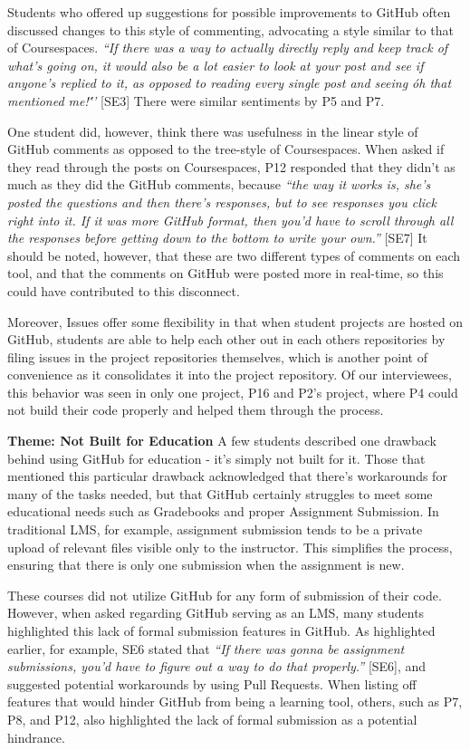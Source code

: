 Students who offered up suggestions for possible improvements to GitHub often discussed changes to this style of commenting, advocating a style similar to that of Coursespaces. \textit{``If there was a way to actually directly reply and keep track of what's going on, it would also be a lot easier to look at your post and see if anyone's replied to it, as opposed to reading every single post and seeing \'oh that mentioned me!\'''} [SE3] There were similar sentiments by P5 and P7.

One student did, however, think there was usefulness in the linear style of GitHub comments as opposed to the tree-style of Coursespaces. When asked if they read through the posts on Coursespaces, P12 responded that they didn't as much as they did the GitHub comments, because \textit{``the way it works is, she's posted the questions and then there's responses, but to see responses you click right into it. If it was more GitHub format, then you'd have to scroll through all the responses before getting down to the bottom to write your own.''} [SE7] It should be noted, however, that these are two different types of comments on each tool, and that the comments on GitHub were posted more in real-time, so this could have contributed to this disconnect.

Moreover, Issues offer some flexibility in that when student projects are hosted on GitHub, students are able to help each other out in each others repositories by filing issues in the project repositories themselves, which is another point of convenience as it consolidates it into the project repository. Of our interviewees, this behavior was seen in only one project, P16 and P2's project, where P4 could not build their code properly and helped them through the process.

\textbf{Theme: Not Built for Education} \break
A few students described one drawback behind using GitHub for education - it's simply not built for it. Those that mentioned this particular drawback acknowledged that there's workarounds for many of the tasks needed, but that GitHub certainly struggles to meet some educational needs such as Gradebooks and proper Assignment Submission. In traditional LMS, for example, assignment submission tends to be a private upload of relevant files visible only to the instructor. This simplifies the process, ensuring that there is only one submission when the assignment is new.

These courses did not utilize GitHub for any form of submission of their code. However, when asked regarding GitHub serving as an LMS, many students highlighted this lack of formal submission features in GitHub. As highlighted earlier, for example, SE6 stated that \textit{``If there was gonna be assignment submissions, you'd have to figure out a way to do that properly.''} [SE6], and suggested potential workarounds by using Pull Requests. When listing off features that would hinder GitHub from being a learning tool, others, such as P7, P8, and P12, also highlighted the lack of formal submission as a potential hindrance.

